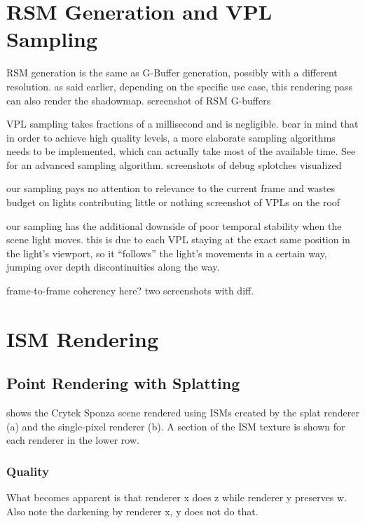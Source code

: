 \section{RSM Generation and VPL Sampling}
\begin{outline}
\1 RSM generation is the same as G-Buffer generation, possibly with a different resolution. as said earlier, depending on the specific use case, this rendering pass can also render the shadowmap.
\1 screenshot of RSM G-buffers

\1 VPL sampling takes fractions of a millisecond and is negligible. bear in mind that in order to achieve high quality levels, a more elaborate sampling algorithms needs to be implemented, which can actually take most of the available time. See \citep{hedman2016sequential} for an advanced sampling algorithm.
\1 screenshots of debug splotches visualized

\1 our sampling pays no attention to relevance to the current frame and wastes budget on lights contributing little or nothing
\1 screenshot of VPLs on the roof

\1 our sampling has the additional downside of poor temporal stability when the scene light moves. this is due to each VPL staying at the exact same position in the light's viewport, so it ``follows'' the light's movements in a certain way, jumping over depth discontinuities along the way.

\1 frame-to-frame coherency here? two screenshots with diff.
\end{outline}


\section{ISM Rendering}

\subsection{Point Rendering with Splatting}

 shows the Crytek Sponza scene rendered using ISMs created by the splat renderer (a) and the single-pixel renderer (b). A section of the ISM texture is shown for each renderer in the lower row.


\subsubsection{Quality}

What becomes apparent is that renderer x does z while renderer y preserves w. Also note the darkening by renderer x, y does not do that.

